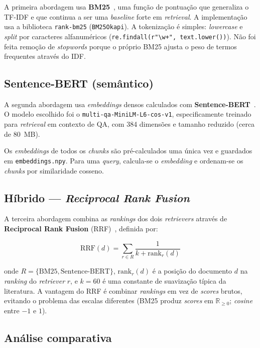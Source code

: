 \documentclass[11pt,a4paper]{article}
\begin{document}
A primeira abordagem usa \textbf{BM25}~\cite{bm25}, uma função de pontuação que generaliza o TF-IDF e que continua a ser uma \emph{baseline} forte em \emph{retrieval}. A implementação usa a biblioteca \texttt{rank-bm25} (\texttt{BM25Okapi}). A tokenização é simples: \emph{lowercase} e \emph{split} por caracteres alfanuméricos (\texttt{re.findall(r"\textbackslash w+", text.lower())}). Não foi feita remoção de \emph{stopwords} porque o próprio BM25 ajusta o peso de termos frequentes através do IDF.

\subsection{Sentence-BERT (semântico)}

A segunda abordagem usa \emph{embeddings} densos calculados com \textbf{Sentence-BERT}~\cite{sbert}. O modelo escolhido foi o \texttt{multi-qa-MiniLM-L6-cos-v1}, especificamente treinado para \emph{retrieval} em contexto de QA, com 384 dimensões e tamanho reduzido (cerca de 80~MB).

Os \emph{embeddings} de todos os \emph{chunks} são pré-calculados uma única vez e guardados em \texttt{embeddings.npy}. Para uma \emph{query}, calcula-se o \emph{embedding} e ordenam-se os \emph{chunks} por similaridade cosseno.

\subsection{Híbrido --- \emph{Reciprocal Rank Fusion}}

A terceira abordagem combina as \emph{rankings} dos dois \emph{retrievers} através de \textbf{Reciprocal Rank Fusion} (RRF)~\cite{rrf}, definida por:

\begin{equation}
\text{RRF}(d) = \sum_{r \in R} \frac{1}{k + \text{rank}_r(d)}
\end{equation}

\noindent onde $R = \{\text{BM25}, \text{Sentence-BERT}\}$, $\text{rank}_r(d)$ é a posição do documento $d$ na \emph{ranking} do \emph{retriever} $r$, e $k = 60$ é uma constante de suavização típica da literatura. A vantagem do RRF é combinar \emph{rankings} em vez de \emph{scores} brutos, evitando o problema das escalas diferentes (BM25 produz \emph{scores} em $\mathbb{R}_{\geq 0}$; \emph{cosine} entre $-1$ e $1$).

\subsection{Análise comparativa}
\end{document}
